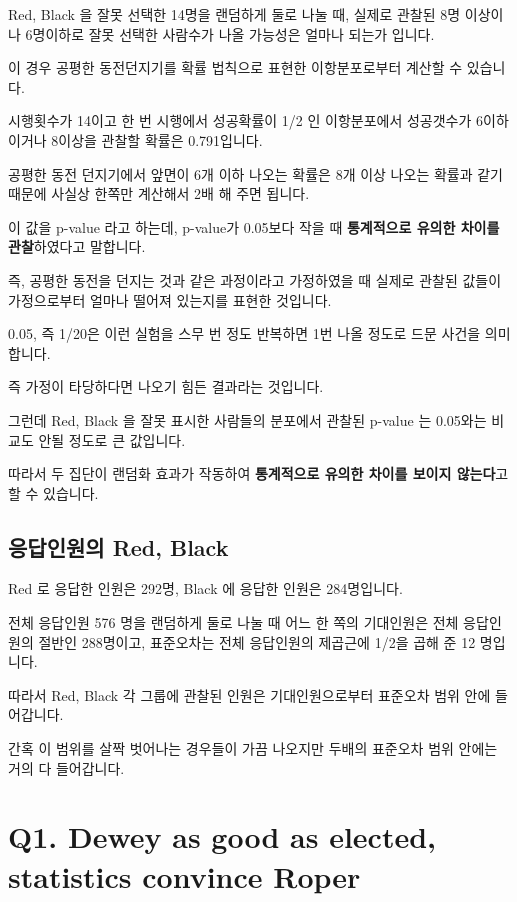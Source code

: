 \documentclass[
]{book}
\begin{document}
Red, Black 을 잘못 선택한 14명을 랜덤하게 둘로 나눌 때, 실제로 관찰된 8명 이상이나 6명이하로 잘못 선택한 사람수가 나올 가능성은 얼마나 되는가 입니다.

이 경우 공평한 동전던지기를 확률 법칙으로 표현한 이항분포로부터 계산할 수 있습니다.

시행횟수가 14이고 한 번 시행에서 성공확률이 1/2 인 이항분포에서 성공갯수가 6이하이거나 8이상을 관찰할 확률은 0.791입니다.

공평한 동전 던지기에서 앞면이 6개 이하 나오는 확률은 8개 이상 나오는 확률과 같기 때문에 사실상 한쪽만 계산해서 2배 해 주면 됩니다.

이 값을 p-value 라고 하는데, p-value가 0.05보다 작을 때 \textbf{통계적으로 유의한 차이를 관찰}하였다고 말합니다.

즉, 공평한 동전을 던지는 것과 같은 과정이라고 가정하였을 때 실제로 관찰된 값들이 가정으로부터 얼마나 떨어져 있는지를 표현한 것입니다.

0.05, 즉 1/20은 이런 실험을 스무 번 정도 반복하면 1번 나올 정도로 드문 사건을 의미합니다.

즉 가정이 타당하다면 나오기 힘든 결과라는 것입니다.

그런데 Red, Black 을 잘못 표시한 사람들의 분포에서 관찰된 p-value 는 0.05와는 비교도 안될 정도로 큰 값입니다.

따라서 두 집단이 랜덤화 효과가 작동하여 \textbf{통계적으로 유의한 차이를 보이지 않는다}고 할 수 있습니다.

\subsection{응답인원의 Red, Black}\label{uxc751uxb2f5uxc778uxc6d0uxc758-red-black}

Red 로 응답한 인원은 292명, Black 에 응답한 인원은 284명입니다.

전체 응답인원 576 명을 랜덤하게 둘로 나눌 때 어느 한 쪽의 기대인원은 전체 응답인원의 절반인 288명이고, 표준오차는 전체 응답인원의 제곱근에 1/2을 곱해 준 12 명입니다.

따라서 Red, Black 각 그룹에 관찰된 인원은 기대인원으로부터 표준오차 범위 안에 들어갑니다.

간혹 이 범위를 살짝 벗어나는 경우들이 가끔 나오지만 두배의 표준오차 범위 안에는 거의 다 들어갑니다.

\section{Q1. Dewey as good as elected, statistics convince Roper}\label{q1.-dewey-as-good-as-elected-statistics-convince-roper}
\end{document}
